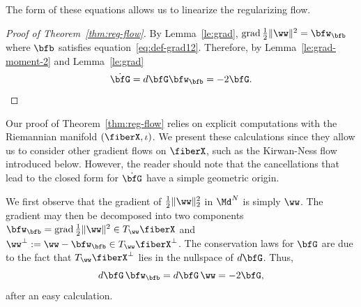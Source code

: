 The form of these equations allows us to linearize the regularizing flow.
\begin{proof}[Proof of Theorem~\ref{thm:reg-flow}]
By Lemma~\ref{le:grad}, $\grad \tfrac{1}{2}\|\ww\|^2 = \bfw_\bfb$ where $\bfb$ satisfies equation~\eqref{eq:def-grad12}. Therefore, by Lemma~\ref{le:grad-moment-2} and Lemma~\ref{le:grad} 
\begin{equation}
\label{eq:dotG}
\dot{\bfG} = d\bfG \bfw_\bfb = -2 \bfG.     
\end{equation} 
\end{proof}
\begin{remark}
\label{rem:proof-reg-flow}
Our proof of Theorem~\ref{thm:reg-flow} relies on explicit computations with the Riemannian manifold $(\fiberX,\iota)$. We present these calculations since they allow us to consider other gradient flows on $\fiberX$, such as the Kirwan-Ness flow introduced below. However, the reader should note that the cancellations that lead to the closed form for $\dot{\bfG}$ have a simple geometric origin. 

We first observe that the gradient of $\tfrac{1}{2}\|\ww\|_2^2$ in $\Md^N$ is simply $\ww$. The gradient may then be decomposed into two components $\bfw_\bfb=\grad \tfrac{1}{2}\|\ww\|^2 \in T_\ww\fiberX$ and $\ww^\perp:=\ww-\bfw_\bfb \in T_\ww\fiberX^\perp$.  The conservation laws for $\bfG$ are due to the fact that $T_\ww\fiberX^\perp$ lies in the nullspace of $d\bfG$. Thus,
\[ d\bfG \, \bfw_\bfb = d\bfG \,\ww = -2\bfG,\]
after an easy calculation. %
\end{remark}
